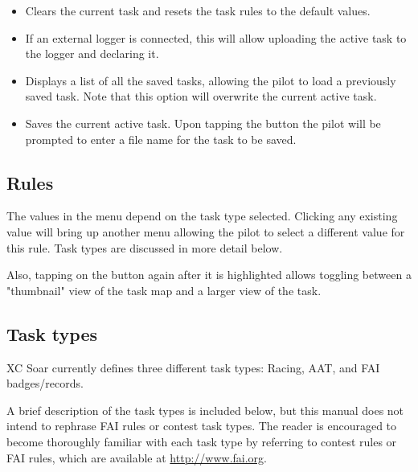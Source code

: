\begin{itemize}
\item {} Clears the current task and resets the task rules to 
  the default values.
\item {}  If an external logger is connected, this will allow 
  uploading the  active task to the logger and declaring it.
\item {} Displays a list of all the saved tasks, allowing the 
  pilot to load a previously saved task.  Note that this option will overwrite 
  the current active task.
\item {}  Saves the current active task.  Upon tapping the 
   button the pilot will be prompted to enter a file name for the 
  task to be saved.
\end{itemize}

\subsection*{Rules}
The values in the  menu depend on the task type selected.  Clicking 
any existing value will bring up another menu allowing the pilot to select a 
different value for this rule.  Task types are discussed in more detail below.

Also, tapping on the  button again after it is highlighted allows 
toggling between a "thumbnail" view of the task map and a larger view of the task.

\subsection*{Task types}
XC Soar currently defines three different task types: Racing, AAT, and FAI badges/records.

A brief description of the task types is included below, but this manual does 
not intend to rephrase FAI rules or contest task types.  The reader is encouraged 
to become thoroughly familiar with each task type by referring to contest rules 
or FAI rules, which are available at \url{http://www.fai.org}. 

